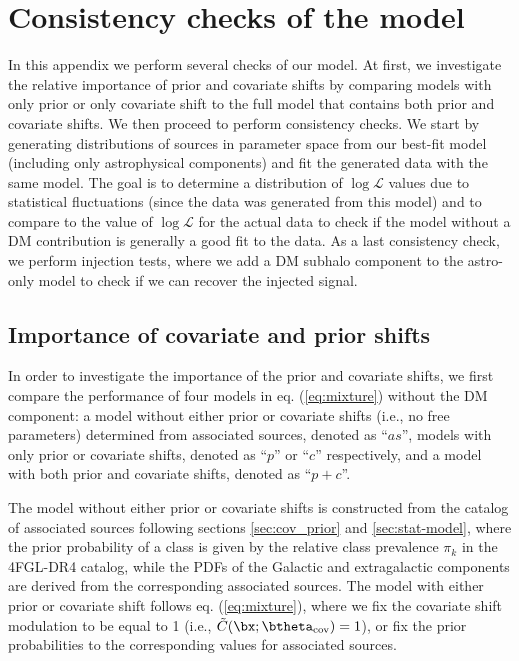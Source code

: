 \section{Consistency checks of the model}
\label{app:MC}


In this appendix we perform several checks of our model.
At first, we investigate the relative importance of prior and covariate shifts by comparing models with only prior or only covariate shift to the full model that contains both prior and covariate shifts. 
We then proceed to perform consistency checks. We start by generating distributions of sources in parameter space from our best-fit model (including only astrophysical components) and fit the generated data with the same model.
The goal is to determine a distribution of $\log\mathcal{L}$ values due to statistical fluctuations (since the data was generated from this model) and to compare to the value of $\log\mathcal{L}$ for the actual data to check if the model without a DM contribution is generally a good fit to the data.
As a last consistency check, we perform injection tests, where we add a DM subhalo component to the astro-only model to check if we can recover the injected signal.

\subsection{Importance of covariate and prior shifts}
\label{app:prior_vs_cov}

In order to investigate the importance of the prior and covariate shifts, 
we first compare the performance of four models in eq. (\ref{eq:mixture}) without the DM component: a model without either prior or covariate shifts (i.e., no free parameters) determined from associated sources, denoted as ``$as$'', models with only prior or covariate shifts, denoted as ``$p$'' or ``$c$'' respectively, and a model with both prior and covariate shifts, denoted as ``$p+c$''. 

The model without either prior or covariate shifts is constructed from the catalog of associated sources following sections \ref{sec:cov_prior} and \ref{sec:stat-model}, where the prior probability of a class is given by the relative class prevalence $\pi_k$ in the 4FGL-DR4 catalog, while the PDFs of the Galactic and extragalactic components are derived from the corresponding associated sources.
The model with either prior or covariate shift follows eq. (\ref{eq:mixture}), 
where we fix the covariate shift modulation to be equal to 1 (i.e., $\tilde{C}(\bx; \btheta_\textrm{cov}) = 1$), or fix the prior probabilities to the corresponding values for associated sources.


